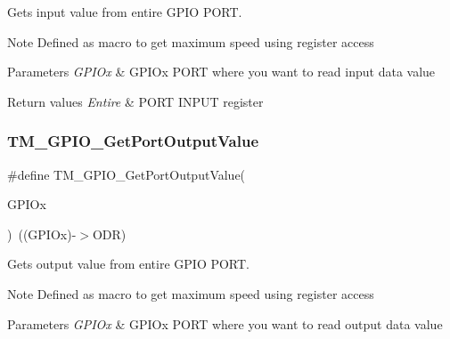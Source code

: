 Gets input value from entire G\+P\+IO P\+O\+RT. 

\begin{DoxyNote}{Note}
Defined as macro to get maximum speed using register access 
\end{DoxyNote}

\begin{DoxyParams}{Parameters}
{\em G\+P\+I\+Ox} & G\+P\+I\+Ox P\+O\+RT where you want to read input data value \\
\hline
\end{DoxyParams}

\begin{DoxyRetVals}{Return values}
{\em Entire} & P\+O\+RT I\+N\+P\+UT register \\
\hline
\end{DoxyRetVals}
\mbox{\label{group___t_m___g_p_i_o___functions_gaa84d8eae98478601cb845dfc13089769}} 
\subsubsection{\texorpdfstring{T\+M\+\_\+\+G\+P\+I\+O\+\_\+\+Get\+Port\+Output\+Value}{TM\_GPIO\_GetPortOutputValue}}
{\footnotesize\ttfamily \#define T\+M\+\_\+\+G\+P\+I\+O\+\_\+\+Get\+Port\+Output\+Value(\begin{DoxyParamCaption}\item[{}]{G\+P\+I\+Ox }\end{DoxyParamCaption})~((G\+P\+I\+Ox)-\/$>$O\+DR)}



Gets output value from entire G\+P\+IO P\+O\+RT. 

\begin{DoxyNote}{Note}
Defined as macro to get maximum speed using register access 
\end{DoxyNote}

\begin{DoxyParams}{Parameters}
{\em G\+P\+I\+Ox} & G\+P\+I\+Ox P\+O\+RT where you want to read output data value \\
\hline
\end{DoxyParams}

